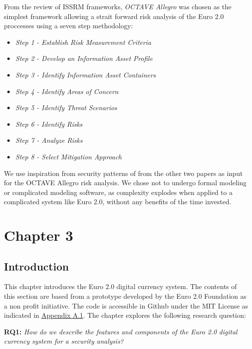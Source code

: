 \documentclass[a4paper,12pt]{article} %
\begin{document}
From the review of ISSRM frameworks, \textit{OCTAVE Allegro} was chosen as the simplest framework allowing a strait forward risk analysis of the Euro 2.0 proccesses using a seven step methodology\cite{CaralliIntroducingOCTAVE2007}:

\begin{itemize}
	\item \textit{Step 1 - Establish Risk Measurement Criteria}
	\item \textit{Step 2 - Develop an Information Asset Profile}
	\item \textit{Step 3 - Identify Information Asset Containers}
	\item \textit{Step 4 - Identify Areas of Concern}
	\item \textit{Step 5 - Identify Threat Scenarios}
	\item \textit{Step 6 - Identify Risks}
	\item \textit{Step 7 - Analyze Risks}
	\item \textit{Step 8 - Select Mitigation Approach}
\end{itemize}

We use inspiration from security patterns of from the other two papers as input for the OCTAVE Allegro risk analysis. We chose not to undergo formal modeling or complicated modeling software, as complexity explodes when applied to a complicated system like Euro 2.0, without any benefits of the time invested.

\pagebreak

\section{Chapter 3} \label{sec:3}

\subsection{Introduction} \label{ssec:3.1}
This chapter introduces the Euro 2.0 digital currency system. The contents of this section are based from a prototype developed by the Euro 2.0 Foundation as a non profit initiative. The code is accessible in Github under the MIT License as indicated in \hyperref[ssec:a.1]{Appendix A.1}. The chapter explores the following research question:

\begin{quoting}
\textbf{RQ1:} \textit{How do we describe the features and components of the Euro 2.0 digital currency system for a security analysis?}
\end{quoting}
\end{document}
